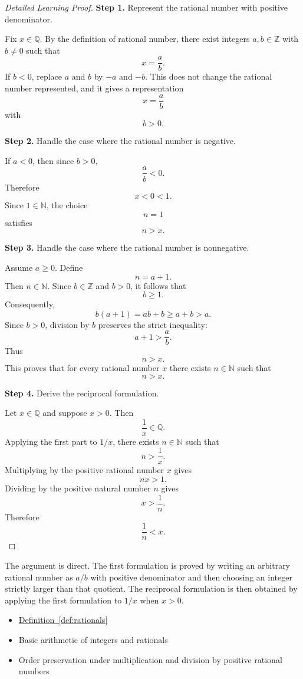 \begin{proof}[Detailed Learning Proof]
\LRAProofBodyStart

\textbf{Step 1.} Represent the rational number with positive denominator.

Fix $x\in\mathbb{Q}$. By the definition of rational number, there exist
integers $a,b\in\mathbb{Z}$ with $b\neq 0$ such that
\[
x=\frac{a}{b}.
\]
If $b<0$, replace $a$ and $b$ by $-a$ and $-b$. This does not change
the rational number represented, and it gives a representation
\[
x=\frac{a}{b}
\]
with
\[
b>0.
\]

\textbf{Step 2.} Handle the case where the rational number is negative.

If $a<0$, then since $b>0$,
\[
\frac{a}{b}<0.
\]
Therefore
\[
x<0<1.
\]
Since $1\in\mathbb{N}$, the choice
\[
n=1
\]
satisfies
\[
n>x.
\]

\textbf{Step 3.} Handle the case where the rational number is nonnegative.

Assume $a\ge 0$. Define
\[
n=a+1.
\]
Then $n\in\mathbb{N}$. Since $b\in\mathbb{Z}$ and $b>0$, it follows
that
\[
b\ge 1.
\]
Consequently,
\[
b(a+1)=ab+b\ge a+b>a.
\]
Since $b>0$, division by $b$ preserves the strict inequality:
\[
a+1>\frac{a}{b}.
\]
Thus
\[
n>x.
\]
This proves that for every rational number $x$ there exists
$n\in\mathbb{N}$ such that
\[
n>x.
\]

\textbf{Step 4.} Derive the reciprocal formulation.

Let $x\in\mathbb{Q}$ and suppose $x>0$. Then
\[
\frac{1}{x}\in\mathbb{Q}.
\]
Applying the first part to $1/x$, there exists $n\in\mathbb{N}$ such
that
\[
n>\frac{1}{x}.
\]
Multiplying by the positive rational number $x$ gives
\[
nx>1.
\]
Dividing by the positive natural number $n$ gives
\[
x>\frac{1}{n}.
\]
Therefore
\[
\frac{1}{n}<x.
\]
\end{proof}

\begin{remark*}
The argument is direct. The first formulation is proved by writing an
arbitrary rational number as $a/b$ with positive denominator and then
choosing an integer strictly larger than that quotient. The reciprocal
formulation is then obtained by applying the first formulation to $1/x$
when $x>0$.
\end{remark*}

\begin{dependencies}
\begin{itemize}
  \item \hyperref[def:rationals]{Definition~\ref*{def:rationals}}
  \item Basic arithmetic of integers and rationals
  \item Order preservation under multiplication and division by positive rational numbers
\end{itemize}
\end{dependencies}

\clearpage
